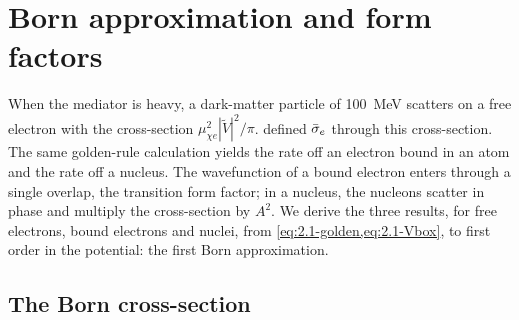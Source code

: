 \section{Born approximation and form factors}\label{sec:2.2}

When the mediator is heavy, a dark-matter particle of \SI{100}{MeV} scatters on a free electron with the cross-section $\mu_{\chi e}^2|\tilde V|^2/\pi$.  defined $\bar{\sigma}_{e}$ through this cross-section. The same golden-rule calculation yields the rate off an electron bound in an atom and the rate off a nucleus. The wavefunction of a bound electron enters through a single overlap, the transition form factor; in a nucleus, the nucleons scatter in phase and multiply the cross-section by $A^2$. We derive the three results, for free electrons, bound electrons and nuclei, from \cref{eq:2.1-golden,eq:2.1-Vbox}, to first order in the potential: the first Born approximation.

\subsection{The Born cross-section}

